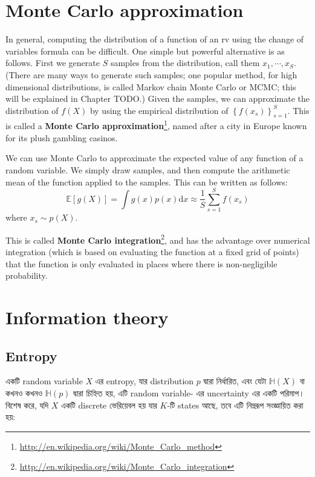 \documentclass[graybox, envcountchap, twocolumn]{styles/svmult}
\begin{document}
\section{Monte Carlo approximation}
\label{sec:Monte-Carlo-approximation}
In general, computing the distribution of a function of an rv using the change of variables formula can be difficult. One simple but powerful alternative is as follows. First we generate $S$ samples from the distribution, call them $x_1,\cdots,x_S$. (There are many ways to generate such samples; one popular method, for high dimensional distributions, is called Markov chain Monte Carlo or MCMC; this will be explained in Chapter TODO.) Given the samples, we can approximate the distribution of $f(X)$ by using the empirical distribution of $\left\{f(x_s)\right\}_{s=1}^S$. This is called a \textbf{Monte Carlo approximation}\footnote{\url{http://en.wikipedia.org/wiki/Monte_Carlo_method}}, named after a city in Europe known for its plush gambling casinos.

We can use Monte Carlo to approximate the expected value of any function of a random variable. We simply draw samples, and then compute the arithmetic mean of the function applied to the samples. This can be written as follows:
\begin{equation}
\mathbb{E}[g(X)]=\int g(x)p(x)\mathrm{d}x \approx \dfrac{1}{S}\sum\limits_{s=1}^S f(x_s)
\end{equation}
where $x_s \sim p(X)$.

This is called \textbf{Monte Carlo integration}\footnote{\url{http://en.wikipedia.org/wiki/Monte_Carlo_integration}}, and has the advantage over numerical integration (which is based on evaluating the function at a fixed grid of points) that the function is only evaluated in places where there is non-negligible probability.


\section{Information theory}

\subsection{Entropy}
\label{sec:Entropy}
{\bengalifont একটি random variable $X$ এর entropy, যার distribution $p$ দ্বারা নির্ধারিত, এবং যেটা $\mathbb{H}(X)$ বা কখনও কখনও $\mathbb{H}(p)$ দ্বারা চিহ্নিত হয়, এটি random variable- এর  uncertainty এর একটি পরিমাপ। বিশেষ করে, যদি $X$ একটি discrete ভেরিয়েবল হয় যার $K$-টি states আছে, তবে এটি নিম্নরূপ সংজ্ঞায়িত করা হয়:}
\end{document}
